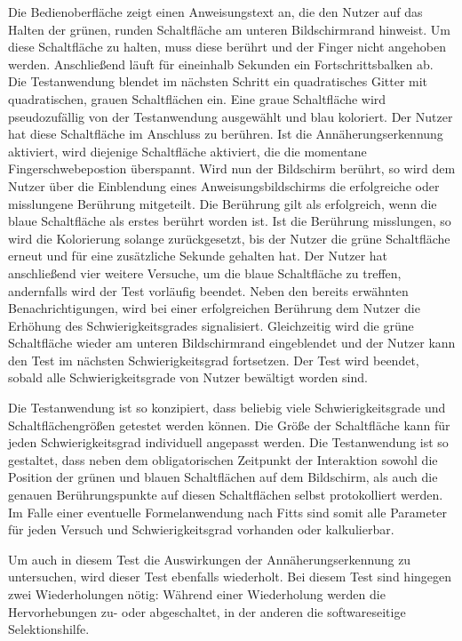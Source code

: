 \documentclass[a4paper,12pt,bibliography=totoc]{scrreprt}%
\begin{document}
Die Bedienoberfläche zeigt einen Anweisungstext an, die den Nutzer auf das Halten der grünen, runden Schaltfläche am unteren Bildschirmrand hinweist. Um diese Schaltfläche zu halten, muss diese berührt und der Finger nicht angehoben werden. Anschließend läuft für eineinhalb Sekunden ein Fortschrittsbalken ab. Die Testanwendung blendet im nächsten Schritt ein quadratisches Gitter mit quadratischen, grauen Schaltflächen ein. Eine graue Schaltfläche wird pseudozufällig von der Testanwendung ausgewählt und blau koloriert. Der Nutzer hat diese Schaltfläche im Anschluss zu berühren. Ist die Annäherungserkennung aktiviert, wird diejenige Schaltfläche aktiviert, die die momentane Fingerschwebepostion überspannt. Wird nun der Bildschirm berührt, so wird dem Nutzer über die Einblendung eines Anweisungsbildschirms die erfolgreiche oder misslungene Berührung mitgeteilt. Die Berührung gilt als erfolgreich, wenn die blaue Schaltfläche als erstes berührt worden ist.
Ist die Berührung misslungen, so wird die Kolorierung solange zurückgesetzt, bis der Nutzer die grüne Schaltfläche erneut und für eine zusätzliche Sekunde gehalten hat. Der Nutzer hat anschließend vier weitere Versuche, um die blaue Schaltfläche zu treffen, andernfalls wird der Test vorläufig beendet.
Neben den bereits erwähnten Benachrichtigungen, wird bei einer erfolgreichen Berührung dem Nutzer die Erhöhung des Schwierigkeitsgrades signalisiert. Gleichzeitig wird die grüne Schaltfläche wieder am unteren Bildschirmrand eingeblendet und der Nutzer kann den Test im nächsten Schwierigkeitsgrad fortsetzen. Der Test wird beendet, sobald alle Schwierigkeitsgrade von Nutzer bewältigt worden sind.

Die Testanwendung ist so konzipiert, dass beliebig viele Schwierigkeitsgrade und Schaltflächengrößen getestet werden können. Die Größe der Schaltfläche kann für jeden Schwierigkeitsgrad individuell angepasst werden. Die Testanwendung ist so gestaltet, dass neben dem obligatorischen Zeitpunkt der Interaktion sowohl die Position der grünen und blauen Schaltflächen auf dem Bildschirm, als auch die genauen Berührungspunkte auf diesen Schaltflächen selbst protokolliert werden. Im Falle einer eventuelle Formelanwendung nach Fitts \cite{fitts} sind somit alle Parameter für jeden Versuch und Schwierigkeitsgrad vorhanden oder kalkulierbar.

Um auch in diesem Test die Auswirkungen der Annäherungserkennung zu untersuchen, wird dieser Test ebenfalls wiederholt. Bei diesem Test sind hingegen zwei Wiederholungen nötig: Während einer Wiederholung werden die Hervorhebungen zu- oder abgeschaltet, in der anderen die softwareseitige Selektionshilfe.
\end{document}
